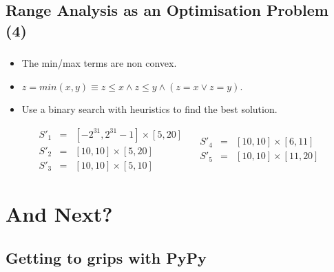 \documentclass[compress]{beamer}
\begin{document}
\subsection{Range Analysis as an Optimisation Problem (4)}
\begin{frame}[fragile]
	\frametitle{\insertsubsection}

\begin{itemize}
\item The min/max terms are non convex.
\vfill
\item $z = min(x, y) \equiv z \leq x \wedge z \leq y \wedge (z = x \vee z = y)$.
\vfill
\item Use a binary search with heuristics to find the best solution.
\end{itemize}

\vfill

\[
\begin{array}{rcl}
S'_1 & = & [-2^{31}, 2^{31} - 1] \times [5, 20] \\
S'_2 & = & [10, 10] \times [5, 20] \\
S'_3 & = & [10, 10] \times [5, 10]
\end{array}
\quad
\begin{array}{rcl}
S'_4 & = & [10, 10] \times [6, 11] \\
S'_5 & = & [10, 10] \times [11, 20]
\end{array}
\]

\end{frame}

\section{And Next?}

\begin{frame}
  \sectionpage
\end{frame}


\subsection{Getting to grips with PyPy}
\begin{frame}[fragile]
	\frametitle{\insertsubsection}
\end{frame}
\end{document}
